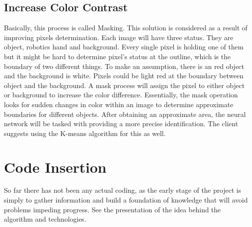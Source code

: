 \documentclass[10pt,journal,compsoc, draftclsnofoot,onecolumn]{IEEEtran}
\begin{document}
\subsection{Increase Color Contrast}
Basically, this process is called Masking.
This solution is considered as a result of improving pixels determination.
Each image will have three status.
They are object, robotics hand and background.
Every single pixel is holding one of them but it might be hard to determine pixel's status at the outline, which is the boundary of two different things.
To make an assumption, there is an red object and the background is white.
Pixels could be light red at the boundary between object and the background.
A mask process will assign the pixel to either object or background to increase the color difference.
Essentially, the mask operation looks for sudden changes in color within an image to determine approximate boundaries for different objects.
After obtaining an approximate area, the neural network will be tasked with providing a more precise identification.
The client suggests using the K-means algorithm for this as well.


\section{Code Insertion}
So far there has not been any actual coding, as the early stage of the project is simply to gather information and build a foundation of knowledge that will avoid problems impeding progress.
See the presentation of the idea behind the algorithm and technologies. 




\end{document}
